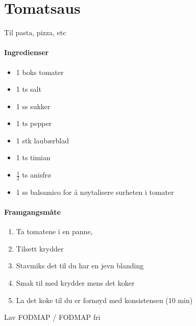 \section{﻿Tomatsaus}
Til pasta, pizza, etc

\paragraph{Ingredienser}
\begin{itemize}[noitemsep]
	\item 1 boks tomater
	\item 1 ts salt
	\item 1 ss sukker
	\item 1 ts pepper
	\item 1 stk laubærblad
	\item 1 ts timian
	\item $\frac{1}{2}$ ts anisfrø
	\item 1 ss balsamico for å nøytalisere surheten i tomater
\end{itemize}

\paragraph{Framgangsmåte}
\begin{enumerate}[noitemsep]
	\item Ta tomatene i en panne,
	\item Tilsett krydder
	\item Stavmiks det til du har en jevn blanding
	\item Smak til med krydder mens det koker
	\item La det koke til du er fornøyd med konsistensen (10 min)
	
\end{enumerate}

Lav FODMAP / FODMAP fri
